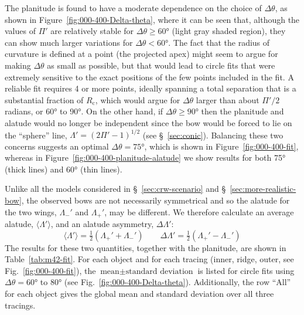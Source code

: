 \documentclass[useAMS, usenatbib, a4paper]{mnras}
\newcommand\C{\ensuremath{\mathrm{c}}}
\begin{document}
The planitude is found to have a moderate dependence on the choice of
\(\Delta\theta\), as shown in Figure~\ref{fig:000-400-Delta-theta}, where it can
be seen that, although the values of \(\Pi'\) are relatively stable for
\(\Delta\theta \ge \ang{60}\) (light gray shaded region), they can show much
larger variations for \(\Delta\theta < \ang{60}\).  The fact that the radius of
curvature is defined at a point (the projected apex) might seem to
argue for making \(\Delta\theta\) as small as possible, but that would lead to
circle fits that were extremely sensitive to the exact positions of
the few points included in the fit.  A reliable fit requires 4 or more
points, ideally spanning a total separation that is a substantial
fraction of \(R_\C\), which would argue for \(\Delta\theta\) larger than about
\(\Pi'/2\) radians, or \ang{60} to \ang{90}.  On the other hand, if
\(\Delta\theta \ge \ang{90}\) then the planitude and alatude would no longer be
independent since the bow would be forced to lie on the ``sphere''
line, \(\Lambda' = (2 \Pi' - 1)^{1/2}\) (see \S~\ref{sec:conic}).  Balancing
these two concerns suggests an optimal \(\Delta\theta = \ang{75}\), which is
shown in Figure~\ref{fig:000-400-fit}, whereas in
Figure~\ref{fig:000-400-planitude-alatude} we show results for both
\ang{75} (thick lines) and \ang{60} (thin lines).

Unlike all the models considered in \S~\ref{sec:crw-scenario} and
\S~\ref{sec:more-realistic-bow}, the observed bows are not necessarily
symmetrical and so the alatude for the two wings, \(\Lambda_-'\) and
\(\Lambda_+'\), may be different.  We therefore calculate an average
alatude, \(\langle\Lambda'\rangle\), and an alatude asymmetry, \(\Delta\Lambda'\):
\begin{equation}
  \label{eq:alatude-average-and-asym}
  \langle\Lambda'\rangle = \tfrac12 \left( \Lambda_+' + \Lambda_-' \right)
  \quad\quad \Delta\Lambda' = \tfrac12 \left( \Lambda_+' - \Lambda_-' \right)
\end{equation}
The results for these two quantities, together with the planitude, are
shown in Table~\ref{tab:m42-fit}.  For each object and for each tracing
(inner, ridge, outer, see Fig.~\ref{fig:000-400-fit}), the
\(\text{mean} \pm \text{standard\ deviation}\) is listed for circle
fits using \(\Delta\theta = \ang{60}\) to \ang{80} (see
Fig.~\ref{fig:000-400-Delta-theta}).  Additionally, the row ``All''
for each object gives the global mean and standard deviation over all
three tracings.
\end{document}
